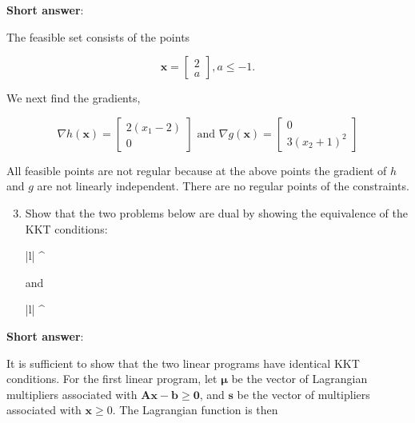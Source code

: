 \textbf{Short answer}:

The feasible set consists of the points

\[
	\boldsymbol{x}=\left[\begin{array}{l}
		2 \\
		a
	\end{array}\right], a \leq-1 .
\]

We next find the gradients,

\[
	\nabla h(\boldsymbol{x})=\left[\begin{array}{c}
		2\left(x_{1}-2\right) \\
		0
	\end{array}\right] \text { and } \nabla g(\boldsymbol{x})=\left[\begin{array}{c}
		0 \\
		3\left(x_{2}+1\right)^{2}
	\end{array}\right]
\]

All feasible points are not regular because at the above points the gradient of \(h\) and \(g\) are not linearly independent. There are no regular points of the constraints.

\begin{enumerate}
	\setcounter{enumi}{2}
	\item Show that the two problems below are dual by showing the equivalence of the KKT conditions:
	\begin{mini*}|l|
		{}{^{\top} }
		{}{}
	\end{mini*}

	and
	\begin{maxi*}|l|
		{\boldsymbol{\lambda}}{^{\top} \boldsymbol{\lambda}}
		{}{}
	\end{maxi*}

\end{enumerate}

\textbf{Short answer}:

It is sufficient to show that the two linear programs have identical KKT conditions. For the first linear program, let \(\boldsymbol{\mu}\) be the vector of Lagrangian multipliers associated with \(\boldsymbol{A} \boldsymbol{x}-\boldsymbol{b} \geq \boldsymbol{0}\), and \(\boldsymbol{s}\) be the vector of multipliers associated with \(\boldsymbol{x} \geq 0\). The Lagrangian function is then

